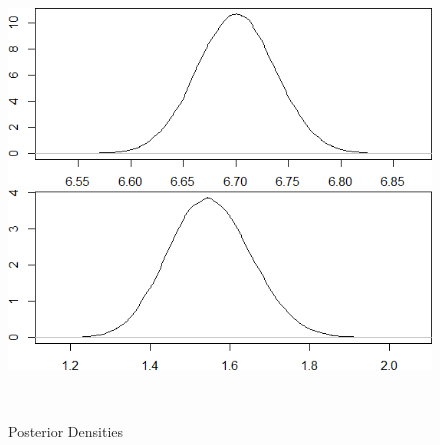\documentclass{Class/julia}
\begin{document}
\begin{figure}[!ht]
    \centering
    \caption{Posterior Densities}
    \label{fig:15}
    \begin{minipage}{0.45\textwidth}
        \centering
        \includegraphics[width=\textwidth]{itamtplcost/density_mu.png}
        \subcaption{\( \mu \)}
    \end{minipage}%
    \hfill
    \begin{minipage}{0.45\textwidth}
        \centering
        \includegraphics[width=\textwidth]{itamtplcost/density_tau.png}
        \subcaption{\( \tau \)}
    \end{minipage} \\
    
    \vspace{0.5cm}
    

\end{figure}
\end{document}
